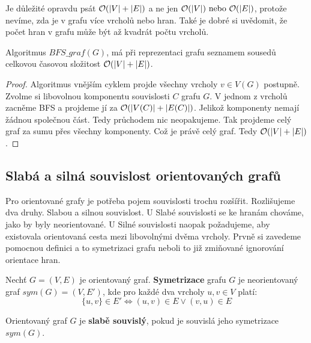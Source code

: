 \noindent Je důležité opravdu psát $\mathcal{O}(|V| + |E|)$ a ne jen $\mathcal{O}(|V|) \text{ nebo } \mathcal{O}(|E|)$, protože nevíme, zda je v grafu více vrcholů nebo hran. Také je dobré si uvědomit, že počet hran v grafu může být až kvadrát počtu vrcholů. 

\medskip

\begin{theorem}
Algoritmus $BFS\_graf(G)$, má při reprezentaci grafu seznamem sousedů celkovou časovou složitost $\mathcal{O}(|V| + |E|)$.
\end{theorem}

\medskip

\begin{proof}
Algoritmus vnějším cyklem projde všechny vrcholy $v \in V(G)$ postupně. Zvolme si libovolnou komponentu souvislosti $C$ grafu $G$. V jednom z vrcholů zacněme BFS a projdeme jí za $\mathcal{O}(|V(C)| + |E(C)|)$. Jelikož komponenty nemají žádnou společnou část. Tedy průchodem nic neopakujeme. Tak projdeme celý graf za sumu přes všechny komponenty. Což je právě celý graf. Tedy $\mathcal{O}(|V| + |E|)$.
\end{proof}

\newpage

\subsection{Slabá a silná souvislost orientovaných grafů}

Pro orientované grafy je potřeba pojem souvislosti trochu rozšířit. Rozlišujeme dva druhy. Slabou a silnou souvislost. U Slabé souvislosti se ke hranám chováme, jako by byly neorientované. U Silné souvislosti naopak požadujeme, aby existovala orientovaná cesta mezi libovolnými dvěma vrcholy. Prvně si zavedeme pomocnou definici a to symetrizaci grafu neboli to již zmiňované ignorování orientace hran. \medskip

\begin{definition}
Nechť $G = (V, E)$ je orientovaný graf. \textbf{Symetrizace} grafu $G$ je neorientovaný graf $sym(G) = (V, E')$, kde pro každé dva vrcholy $u, v \in V$ platí:
$$\{u, v\} \in E' \iff (u, v) \in E \lor (v, u) \in E$$
\end{definition} 

\medskip

\begin{definition}
Orientovaný graf $G$ je \textbf{slabě souvislý}, pokud je souvislá jeho symetrizace $sym(G)$.
\end{definition} 

